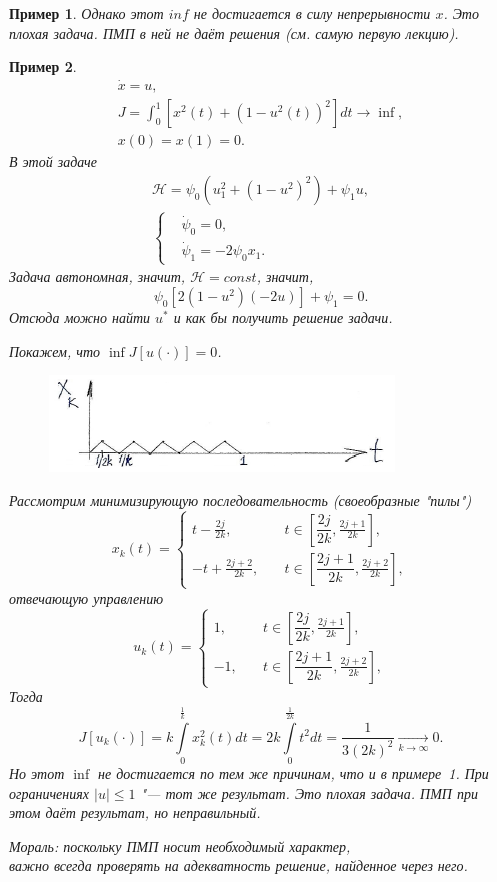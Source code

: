 \documentclass[12pt, a4paper]{article}
\theoremstyle{rusdef}
\newtheorem{example}{Пример}
\renewcommand{\H}{\mathcal{H}} %
\DeclareMathOperator*{\To}{\longrightarrow}
\begin{document}
\begin{example}
  Однако этот $inf$ не достигается в силу непрерывности $x$. Это плохая задача. ПМП в ней не даёт решения (см. самую первую лекцию).
\end{example}

\begin{example}
  \begin{gather*}
    \dot{x} = u, \\
    J = \int_0^1 [x^2(t) + (1 - u^2(t))^2] dt \to \inf, \\
    x(0) = x(1) = 0.
  \end{gather*}
  В этой задаче
  \begin{gather*}
    \H = \psi_0 (u_1^2 + (1 - u^2)^2) + \psi_1 u, \\
    \left\{
      \begin{aligned}
        &\dot{\psi}_0 = 0, \\
        &\dot{\psi}_1 = -2 \psi_0 x_1.
      \end{aligned}
    \right.
  \end{gather*}
  Задача автономная, значит, $\H = const$, значит,
  \[
    \psi_0[2(1 - u^2)(-2u)] + \psi_1 = 0.
  \]
  Отсюда можно найти $u^*$ и \textit{как бы} получить решение задачи.

  Покажем, что $\inf J[u(\cdot)] = 0$.

  \begin{figure}[ht!]
    \centering
    \includegraphics{pic2.png}
  \end{figure}

  Рассмотрим минимизирующую последовательность (своеобразные "пилы")
  \[
    x_k(t) = 
    \left\{
      \begin{aligned}
        t - \frac{2j}{2k}, &\quad t \in \left[\dfrac{2j}{2k}, \frac{2j + 1}{2k}\right], \\
        -t + \frac{2j + 2}{2k}, &\quad t \in \left[\dfrac{2j + 1}{2k}, \frac{2j + 2}{2k}\right],
      \end{aligned}
    \right.
  \]
  отвечающую управлению
  \[
    u_k(t) = 
    \left\{
      \begin{aligned}
        1, &\quad t \in \left[\dfrac{2j}{2k}, \frac{2j + 1}{2k}\right], \\
        -1, &\quad t \in \left[\dfrac{2j + 1}{2k}, \frac{2j + 2}{2k}\right],
      \end{aligned}
    \right.
  \]
  Тогда
  \[
    J[u_k(\cdot)] = k \int\limits_0^{\frac{1}{k}} x_k^2(t) dt = 2k \int\limits_0^{\frac{1}{2k}} t^2 dt = \dfrac{1}{3(2k)^2} \To\limits_{k \to \infty} 0.
  \]
  Но этот $\inf$ не достигается по тем же причинам, что и в примере~1. При ограничениях $|u| \leqslant 1$ "--- тот же результат. Это плохая задача. ПМП при этом даёт результат, но неправильный.

  \textit{Мораль: поскольку ПМП носит необходимый характер, \\важно всегда проверять на адекватность решение, найденное через него}.
\end{example}
\end{document}
